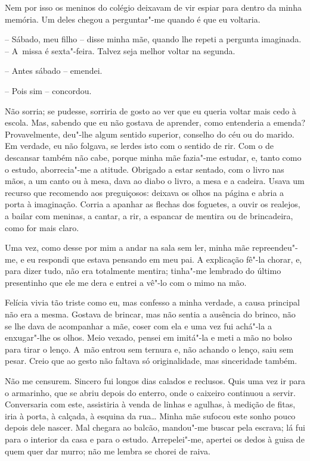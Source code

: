 Nem por isso os meninos do colégio deixavam de vir espiar para dentro da
minha memória. Um deles chegou a perguntar"-me quando é que eu voltaria.

-- Sábado, meu filho -- disse minha mãe, quando lhe repeti a pergunta
imaginada. -- A~missa é sexta"-feira. Talvez seja melhor voltar na
segunda.

-- Antes sábado -- emendei.

-- Pois sim -- concordou.

Não sorria; se pudesse, sorriria de gosto ao ver que eu queria voltar
mais cedo à escola. Mas, sabendo que eu não gostava de aprender, como
entenderia a emenda? Provavelmente, deu"-lhe algum sentido superior,
conselho do céu ou do marido. Em verdade, eu não folgava, se lerdes isto
com o sentido de rir. Com o de descansar também não cabe, porque minha
mãe fazia"-me estudar, e, tanto como o estudo, aborrecia"-me a atitude.
Obrigado a estar sentado, com o livro nas mãos, a um canto ou à mesa,
dava ao diabo o livro, a mesa e a cadeira. Usava um recurso que
recomendo aos preguiçosos: deixava os olhos na página e abria a porta à
imaginação. Corria a apanhar as flechas dos foguetes, a ouvir os
realejos, a bailar com meninas, a cantar, a rir, a espancar de mentira
ou de brincadeira, como for mais claro.

Uma vez, como desse por mim a andar na sala sem ler, minha mãe
repreendeu"-me, e eu respondi que estava pensando em meu pai. A
explicação fê"-la chorar, e, para dizer tudo, não era totalmente mentira;
tinha"-me lembrado do último presentinho que ele me dera e entrei a vê"-lo
com o mimo na mão.

Felícia vivia tão triste como eu, mas confesso a minha verdade, a causa
principal não era a mesma. Gostava de brincar, mas não sentia a ausência
do brinco, não se lhe dava de acompanhar a mãe, coser com ela e uma vez
fui achá"-la a enxugar"-lhe os olhos. Meio vexado, pensei em imitá"-la e
meti a mão no bolso para tirar o lenço. A~mão entrou sem ternura e, não
achando o lenço, saiu sem pesar. Creio que ao gesto não faltava só
originalidade, mas sinceridade também.

Não me censurem. Sincero fui longos dias calados e reclusos. Quis uma
vez ir para o armarinho, que se abriu depois do enterro, onde o caixeiro
continuou a servir. Conversaria com este, assistiria à venda de linhas e
agulhas, à medição de fitas, iria à porta, à calçada, à esquina da
rua\ldots{} Minha mãe sufocou este sonho pouco depois dele nascer. Mal
chegara ao balcão, mandou"-me buscar pela escrava; lá fui para o interior
da casa e para o estudo. Arrepelei"-me, apertei os dedos à guisa de quem
quer dar murro; não me lembra se chorei de raiva.

